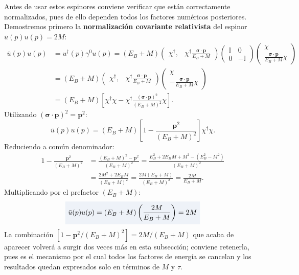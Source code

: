 \documentclass[10pt,a4paper]{article}
\newcommand{\dest}[1]{{\setlength{\fboxsep}{4pt}\colorbox{colordest}{$\displaystyle #1$}}}
\begin{document}
Antes de usar estos espinores conviene verificar que están correctamente normalizados, pues de ello dependen todos los factores numéricos posteriores. Demostremos primero la \textbf{normalización covariante relativista} del espinor $\bar{u}(p) u(p) = 2M$:
\begin{align}
\bar{u}(p) u(p) &= u^\dagger(p) \gamma^0 u(p) = (E_B + M) \begin{pmatrix} \chi^\dagger, & \chi^\dagger \frac{\boldsymbol{\sigma} \cdot \mathbf{p}}{E_B + M} \end{pmatrix} \begin{pmatrix} \mathbb{I} & 0 \\ 0 & -\mathbb{I} \end{pmatrix} \begin{pmatrix} \chi \\ \frac{\boldsymbol{\sigma} \cdot \mathbf{p}}{E_B + M} \chi \end{pmatrix} \nonumber \\
&= (E_B + M) \begin{pmatrix} \chi^\dagger, & \chi^\dagger \frac{\boldsymbol{\sigma} \cdot \mathbf{p}}{E_B + M} \end{pmatrix} \begin{pmatrix} \chi \\ -\frac{\boldsymbol{\sigma} \cdot \mathbf{p}}{E_B + M} \chi \end{pmatrix} \nonumber \\
&= (E_B + M) \left[ \chi^\dagger \chi - \chi^\dagger \frac{(\boldsymbol{\sigma} \cdot \mathbf{p})^2}{(E_B + M)^2} \chi \right].
\end{align}
Utilizando $(\boldsymbol{\sigma} \cdot \mathbf{p})^2 = \mathbf{p}^2$:
\begin{equation}
\bar{u}(p) u(p) = (E_B + M) \left[ 1 - \frac{\mathbf{p}^2}{(E_B + M)^2} \right] \chi^\dagger \chi.
\end{equation}
Reduciendo a común denominador:
\begin{align}
1 - \frac{\mathbf{p}^2}{(E_B + M)^2} &= \frac{(E_B + M)^2 - \mathbf{p}^2}{(E_B + M)^2} = \frac{E_B^2 + 2 E_B M + M^2 - (E_B^2 - M^2)}{(E_B + M)^2} \nonumber \\
&= \frac{2 M^2 + 2 E_B M}{(E_B + M)^2} = \frac{2 M (E_B + M)}{(E_B + M)^2} = \frac{2 M}{E_B + M}.
\end{align}
Multiplicando por el prefactor $(E_B + M)$:
\begin{equation}
\dest{\bar{u}(p) u(p) = (E_B + M) \left( \frac{2 M}{E_B + M} \right) = 2 M}
\end{equation}
La combinación $[1 - \mathbf{p}^2/(E_B+M)^2] = 2M/(E_B+M)$ que acaba de aparecer volverá a surgir dos veces más en esta subsección; conviene retenerla, pues es el mecanismo por el cual todos los factores de energía se cancelan y los resultados quedan expresados solo en términos de $M$ y $\tau$.
\end{document}
